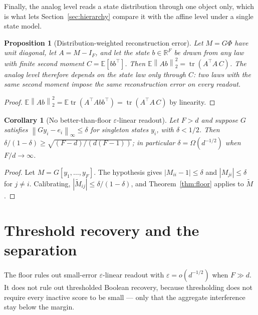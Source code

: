 \documentclass[preprint,12pt]{elsarticle}
\newtheorem{proposition}[theorem]{Proposition}
\newtheorem{corollary}[theorem]{Corollary}
\theoremstyle{definition}
\newcommand{\R}{\mathbb{R}}
\newcommand{\E}{\mathbb{E}}
\newcommand{\norm}[1]{\left\lVert #1 \right\rVert}
\begin{document}
Finally, the analog level reads a state distribution through one object only, which is what lets
Section~\ref{sec:hierarchy} compare it with the affine level under a single state model.

\begin{proposition}[Distribution-weighted reconstruction error]
\label{prop:secondmoment}
Let $M=G\Phi$ have unit diagonal, let $A=M-I_F$, and let the state $b\in\R^F$ be drawn from any
law with finite second moment $C=\E[bb^{\top}]$. Then
$\E\norm{Ab}_2^2=\operatorname{tr}(A^{\top}A\,C)$. The analog level therefore depends on the
state law only through $C$: two laws with the same second moment impose the same reconstruction
error on every readout.
\end{proposition}

\begin{proof}
$\E\norm{Ab}_2^2=\E\operatorname{tr}(A^{\top}Abb^{\top})=\operatorname{tr}(A^{\top}A\,C)$ by
linearity.
\end{proof}

\begin{corollary}[No better-than-floor $\varepsilon$-linear readout]
\label{cor:impossible}
Let $F>d$ and suppose $G$ satisfies $\norm{G y_i-e_i}_\infty\le\delta$ for singleton states
$y_i$, with $\delta<1/2$. Then $\delta/(1-\delta)\ge\sqrt{(F-d)/(d(F-1))}$; in particular
$\delta=\Omega(d^{-1/2})$ when $F/d\to\infty$.
\end{corollary}

\begin{proof}
Let $M=G[y_1,\dots,y_F]$. The hypothesis gives $|M_{ii}-1|\le\delta$ and $|M_{ji}|\le\delta$
for $j\neq i$. Calibrating, $|\widetilde M_{ij}|\le\delta/(1-\delta)$, and
Theorem~\ref{thm:floor} applies to $\widetilde M$.
\end{proof}

\section{Threshold recovery and the separation}
\label{sec:threshold}

The floor rules out small-error $\varepsilon$-linear readout with $\varepsilon=o(d^{-1/2})$
when $F\gg d$. It does not rule out thresholded Boolean recovery, because thresholding does
not require every inactive score to be small --- only that the aggregate interference stay
below the margin.
\end{document}

